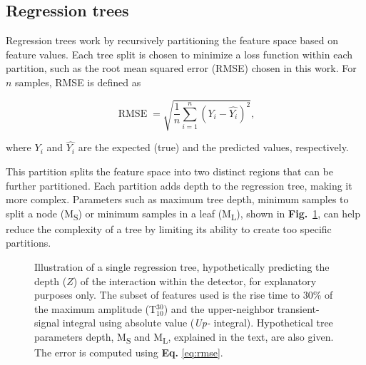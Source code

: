 \subsection{Regression trees}
Regression trees work by recursively partitioning the feature space based on feature values. Each tree split is chosen to minimize a loss function within each partition, such as the root mean squared error (RMSE) chosen in this work. For $n$ samples, RMSE is defined as 

\begin{equation}
\label{eq:rmse}
    \operatorname {RMSE} = \sqrt{\frac{1}{n}\sum _{i=1}^{n}\left(Y_{i}-{\hat {Y_{i}}}\right)^{2}},
\end{equation}

where $Y_{i}$ and $\hat {Y_{i}}$ are the expected (true) and the predicted values, respectively.


This partition splits the feature space into two distinct regions that can be further partitioned. Each partition adds depth to the regression tree, making it more complex. Parameters such as maximum tree depth, minimum samples to split a node (M\textsubscript{S}) or minimum samples in a leaf (M\textsubscript{L}), shown in \textbf{Fig.}~\ref{fig:regression_tree}, can help reduce the complexity of a tree by limiting its ability to create too specific partitions. 

\begin{figure}
\centering
{}
\caption{Illustration of a single regression tree, hypothetically predicting the depth ($Z$) of the interaction within the detector, for explanatory purposes only. The subset of features used is the rise time to 30\% of the maximum amplitude (T$_{10}^{30}$) and the upper-neighbor transient-signal integral using absolute value (\textit{Up-} integral). Hypothetical tree parameters depth, M\textsubscript{S} and M\textsubscript{L}, explained in the text, are also given. The error is computed using \textbf{Eq.} \ref{eq:rmse}.}
\label{fig:regression_tree}
\end{figure}

